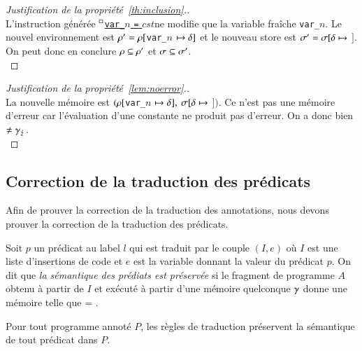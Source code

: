 \begin{proof}[Justification de la propriété~\ref{th:inclusion}.]~\\
  L'instruction générée
  ${^\square}$\underline{\lstinline'var_'$n$ \lstinline'=' $cst$}\semicolon ne
  modifie que la variable fraîche \lstinline'var_'$n$.
  Le nouvel environnement est
  $\rho' = \rho[$\lstinline'var_'$n$ $\mapsto \delta]$
  et le nouveau store est
  $\sigma' = \sigma[\delta \mapsto$ $]$.
  On peut donc en conclure $\rho \subseteq \rho'$ et $\sigma \subseteq \sigma'$.
  ~\\
\end{proof}


\begin{proof}[Justification de la propriété~\ref{lem:noerror}.]~\\
  La nouvelle mémoire est
  $(\rho[$\lstinline'var_'$n$ $\mapsto \delta],$
  $\sigma[\delta \mapsto$ $])$.
  Ce n'est pas une mémoire d'erreur car l'évaluation d'une constante ne produit
  pas d'erreur.
  On a donc bien
   $\neq \gamma_\lightning$.
  ~\\
\end{proof}


\subsection{Correction de la traduction des prédicats}
\label{sec:predicate-translation}


Afin de prouver la correction de la traduction des annotations,
nous devons prouver la correction de la traduction des prédicats.

\begin{definition}
  \label{def:pred-correct}
  Soit $p$ un prédicat au label $l$ qui est traduit par le couple $(I, e)$ où
  $I$ est une liste d'insertions de code et $e$ est la variable donnant la
  valeur du prédicat $p$.
  On dit que \emph{la sémantique des prédiats est préservée} si le fragment de
  programme $A$ obtenu à partir de $I$ et exécuté à partir d'une mémoire
  quelconque $\gamma$ donne une mémoire  telle que
   = .
\end{definition}

\begin{myproperty}
  \label{lem:pred-correct}
  Pour tout programme annoté $P$, les règles de traduction préservent la
  sémantique de tout prédicat \eacsl dans $P$.
\end{myproperty}

